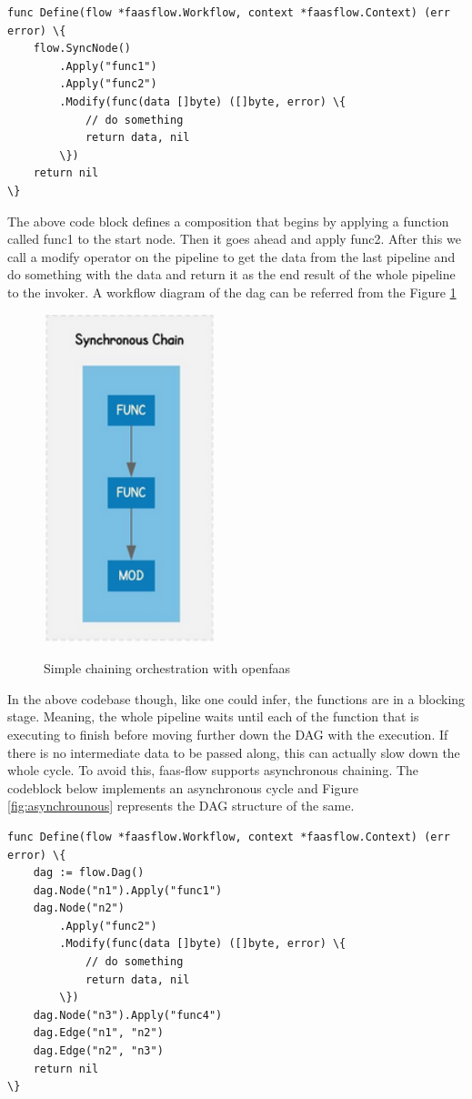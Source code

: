 \documentclass[12pt,titlepage]{article}
\begin{document}
\begin{lstlisting}
func Define(flow *faasflow.Workflow, context *faasflow.Context) (err error) \{
    flow.SyncNode()
        .Apply("func1")
        .Apply("func2")
        .Modify(func(data []byte) ([]byte, error) \{
            // do something
            return data, nil
        \})
    return nil
\}
\end{lstlisting}

The above code block defines a composition that begins by applying a function
called func1 to the start node. Then it goes ahead and apply func2. After this
we call a modify operator on the pipeline to get the data from the last pipeline
and do something with the data and return it as the end result of the whole
pipeline to the invoker. A workflow diagram of the dag can be referred from the
Figure \ref{fig:syncnode} 
\begin{figure}[!h]
    \caption{Simple chaining orchestration with openfaas}
    \centering
    \includegraphics[width=50mm]{./thesis_images/syncnode.png}
    \label{fig:syncnode}
\end{figure}
In the above codebase though, like one could infer, the functions are in a
blocking stage. Meaning, the whole pipeline waits until each of the function
that is executing to finish before moving further down the DAG with the
execution. If there is no intermediate data to be passed along, this can
actually slow down the whole cycle. To avoid this, faas-flow supports
asynchronous chaining. The codeblock below implements an asynchronous cycle and
Figure \ref{fig:asynchrounous} represents the DAG structure of the same.

\begin{lstlisting}
func Define(flow *faasflow.Workflow, context *faasflow.Context) (err error) \{
    dag := flow.Dag()
    dag.Node("n1").Apply("func1")
    dag.Node("n2")
        .Apply("func2")
        .Modify(func(data []byte) ([]byte, error) \{
            // do something
            return data, nil
        \})
    dag.Node("n3").Apply("func4")
    dag.Edge("n1", "n2")
    dag.Edge("n2", "n3")
    return nil
\}
\end{lstlisting}
\end{document}
